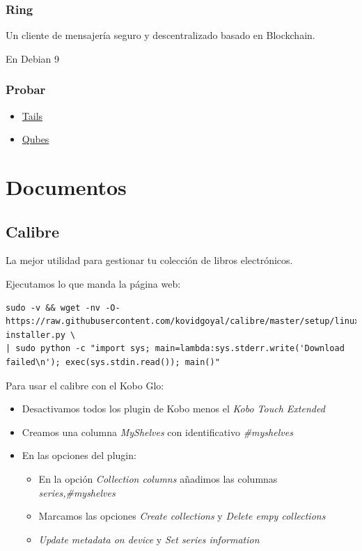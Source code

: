 \documentclass[12pt,spanish,]{scrartcl}
\providecommand{\tightlist}{%
  \setlength{\itemsep}{0pt}\setlength{\parskip}{0pt}}
\begin{document}
\hypertarget{ring}{%
\subsubsection{Ring}\label{ring}}

Un cliente de mensajería seguro y descentralizado basado en Blockchain.

En Debian 9

\hypertarget{probar}{%
\subsubsection{Probar}\label{probar}}

\begin{itemize}
\tightlist
\item
  \href{https://tails.boum.org/index.en.html}{Tails}
\item
  \href{https://www.qubes-os.org/}{Qubes}
\end{itemize}

\hypertarget{documentos}{%
\section{Documentos}\label{documentos}}

\hypertarget{calibre}{%
\subsection{Calibre}\label{calibre}}

La mejor utilidad para gestionar tu colección de libros electrónicos.

Ejecutamos lo que manda la página web:

\begin{verbatim}
sudo -v && wget -nv -O- https://raw.githubusercontent.com/kovidgoyal/calibre/master/setup/linux-installer.py \
| sudo python -c "import sys; main=lambda:sys.stderr.write('Download failed\n'); exec(sys.stdin.read()); main()"
\end{verbatim}

Para usar el calibre con el Kobo Glo:

\begin{itemize}
\item
  Desactivamos todos los plugin de Kobo menos el \emph{Kobo Touch
  Extended}
\item
  Creamos una columna \emph{MyShelves} con identificativo
  \emph{\#myshelves}
\item
  En las opciones del plugin:

  \begin{itemize}
  \tightlist
  \item
    En la opción \emph{Collection columns} añadimos las columnas
    \emph{series,\#myshelves}
  \item
    Marcamos las opciones \emph{Create collections} y \emph{Delete empy
    collections}
  \item
    \emph{Update metadata on device} y \emph{Set series information}
  \end{itemize}
\end{itemize}
\end{document}
